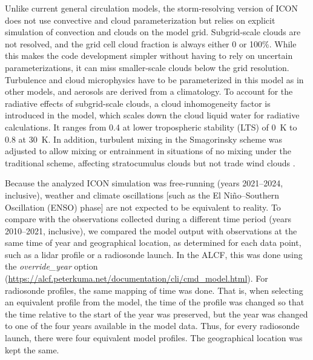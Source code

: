 \documentclass[draft]{agujournal2019}
\begin{document}
Unlike current general circulation models, the storm-resolving version of ICON does not use convective and cloud parameterization but relies on explicit simulation of convection and clouds on the model grid. Subgrid-scale clouds are not resolved, and the grid cell cloud fraction is always either 0 or 100\%. While this makes the code development simpler without having to rely on uncertain parameterizations, it can miss smaller-scale clouds below the grid resolution. Turbulence and cloud microphysics have to be parameterized in this model as in other models, and aerosols are derived from a climatology. To account for the radiative effects of subgrid-scale clouds, a cloud inhomogeneity factor is introduced in the model, which scales down the cloud liquid water for radiative calculations. It ranges from 0.4 at lower tropospheric stability (LTS) of 0~K to 0.8 at 30~K. In addition, turbulent mixing in the Smagorinsky scheme was adjusted to allow mixing or entrainment in situations of no mixing under the traditional scheme, affecting stratocumulus clouds but not trade wind clouds \cite{segura2025}.

Because the analyzed ICON simulation was free-running (years 2021–2024, inclusive), weather and climate oscillations [such as the El Niño–Southern Oscillation (ENSO) phase] are not expected to be equivalent to reality. To compare with the observations collected during a different time period (years 2010–2021, inclusive), we compared the model output with observations at the same time of year and geographical location, as determined for each data point, such as a lidar profile or a radiosonde launch. In the ALCF, this was done using the \emph{override\_year} option (\url{https://alcf.peterkuma.net/documentation/cli/cmd_model.html}). For radiosonde profiles, the same mapping of time was done. That is, when selecting an equivalent profile from the model, the time of the profile was changed so that the time relative to the start of the year was preserved, but the year was changed to one of the four years available in the model data. Thus, for every radiosonde launch, there were four equivalent model profiles. The geographical location was kept the same.
\end{document}
